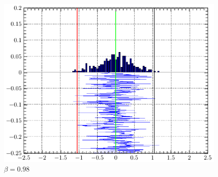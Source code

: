 \documentclass[a4paper,14pt]{extarticle}
\begin{document}
\begin{figure}[H]
\begin{minipage}{0.3\linewidth}
    \caption{$\beta =0.95$}
\end{minipage}
\begin{minipage}{0.3\linewidth}
    \centering
    \includegraphics[width=\linewidth]{fig/gist_n4_b98.pdf}
    \vspace{-1em}
    \caption{$\beta =0.98$}
\end{minipage}
\end{figure}
\end{document}
